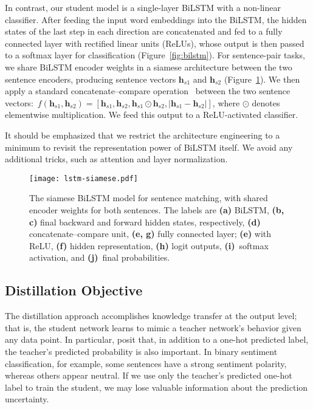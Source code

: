 \documentclass[11pt,a4paper]{article}
\newcommand\caplbl[1]{\textbf{(#1)}}
\begin{document}
In contrast, our student model is a single-layer BiLSTM with a non-linear classifier. After feeding the input word embeddings into the BiLSTM, the hidden states of the last step in each direction are concatenated and fed to a fully connected layer with rectified linear units (ReLUs), whose output is then passed to a softmax layer for classification (Figure~\ref{fig:bilstm}). For sentence-pair tasks, we share BiLSTM encoder weights in a siamese architecture between the two sentence encoders, producing sentence vectors $\bm h_{s1}$ and $\bm h_{s2}$ (Figure~\ref{fig:bilstmsiamese}). We then apply a standard concatenate--compare operation~\cite{wang2018glue} between the two sentence vectors:~$f(\bm h_{s1}, \bm h_{s2}) = [\bm h_{s1}, \bm h_{s2}, \bm h_{s1} \odot \bm h_{s2}, |\bm h_{s1} - \bm h_{s2}|]$, where $\odot$ denotes elementwise multiplication. We feed this output to a ReLU-activated classifier.

It should be emphasized that we restrict the architecture engineering to a minimum to revisit the representation power of BiLSTM itself. We avoid any additional tricks, such as attention and layer normalization. 





\begin{figure}
    \centering
    \texttt{[image: lstm-siamese.pdf]}
    \caption{The siamese BiLSTM model for sentence matching, with shared encoder weights for both sentences. The labels are \caplbl{a} BiLSTM, \caplbl{b, c} final backward and forward hidden states, respectively, \caplbl{d} concatenate--compare unit, \caplbl{e, g} fully connected layer; \caplbl{e} with ReLU, \caplbl{f} hidden representation, \caplbl{h} logit outputs, \caplbl{i}~softmax activation, and \caplbl{j}~final probabilities.}
    \label{fig:bilstmsiamese}
\end{figure}
\subsection{Distillation Objective}\label{sec:distillation-obj}

The distillation approach accomplishes knowledge transfer at the output level; that is, the student network learns to mimic a teacher network's behavior given any data point. In particular, \citet{ba2014deep} posit that, in addition to a one-hot predicted label, the teacher's predicted probability is also important. In binary sentiment classification, for example, some sentences have a strong sentiment polarity, whereas others appear neutral. If we use only the teacher's predicted one-hot label to train the student, we may lose valuable information about the prediction uncertainty.
\end{document}
